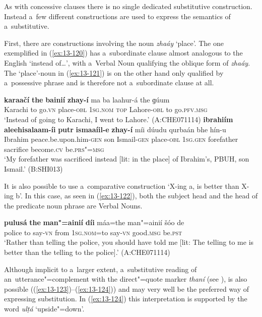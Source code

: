  As with concessive clauses there is no single dedicated substitutive construction. Instead a~few different constructions are used to express the semantics of a~substitutive.


First, there are constructions involving the noun \textit{zhaáy} `place'. The one exemplified in (\ref{ex:13-120}) has a~subordinate clause almost analogous to the English `instead of{\ldots}', with a~Verbal Noun qualifying the oblique form of \textit{zhaáy}. The `place'-noun in (\ref{ex:13-121}) is on the other hand only qualified by a~possessive phrase and is therefore not a~subordinate clause at all. 

\ea
\label{ex:13-120}
\gll \textbf{karaačí} \textbf{the} \textbf{bainií} \textbf{zhay-í} ma ba laahur-á  the ɡúum \\
Karachi to go.\textsc{vn} place-\textsc{obl} \textsc{1sg.nom} \textsc{top} Lahore-\textsc{obl} to go.\textsc{pfv.msg} \\
\glt `Instead of going to Karachi, I went to Lahore.' (A:CHE071114)
\ex
\label{ex:13-121}
\gll \textbf{ibrahiím} \textbf{aleehisalaam-íi} \textbf{putr} \textbf{ismaaíil-e} \textbf{zhay-í} míi dúudu qurbaán bhe hín-u\\
Ibrahim peace.be.upon.him-\textsc{gen} son Ismail-\textsc{gen} place-\textsc{obl}  \textsc{1sg.gen} forefather sacrifice become.\textsc{cv} be.\textsc{prs"=msg} \\
\glt `My forefather was sacrificed instead [lit: in the place] of Ibrahim's, PBUH, son Ismail.' (B:SHI013) 
\z

It is also possible to use a~comparative construction `X-ing a, is better than X-ing b'. In this case, as seen in (\ref{ex:13-122}), both the subject head and the head of the predicate noun phrase are Verbal Nouns.

\begin{exe}
\ex
\label{ex:13-122}
\gll \textbf{pulusá} \textbf{the} \textbf{man"=ainií} \textbf{díi} máa=the man"=ainií šóo de \\
police to say-\textsc{vn} from \textsc{1sg.nom=}to say-\textsc{vn} good.\textsc{msg} be.\textsc{pst} \\
\glt `Rather than telling the police, you should have told me [lit: The telling to me is better than the telling to the police].' (A:CHE071114) 
\end{exe}

Although implicit to a~larger extent, a~substitutive reading of an~utterance"=complement with the direct"=quote marker \textit{thaní} (see ), is also possible ((\ref{ex:13-123})--(\ref{ex:13-124})) and may very well be the preferred way of expressing substitution. In (\ref{ex:13-124}) this interpretation is supported by the word \textit{ulṭá} `upside"=down'.

